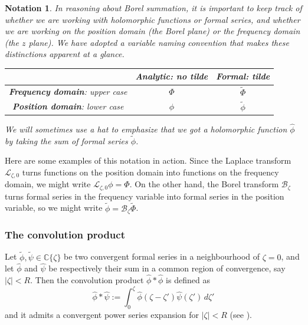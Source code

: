 \documentclass{article}
\newcommand{\C}{\mathbb{C}}
\newcommand{\series}[1]{\tilde{#1}}
\newcommand{\laplace}{\mathcal{L}}
\newcommand{\borel}{\mathcal{B}}
\theoremstyle{definition}
\theoremstyle{plain}
\newtheorem*{notation*}{Notation}
\begin{document}
\begin{notation*}
In reasoning about Borel summation, it is important to keep track of whether we are working with holomorphic functions or formal series, and whether we are working on the position domain (the Borel plane) or the frequency domain (the $z$ plane). We have adopted a variable naming convention that makes these distinctions apparent at a glance.
\color{LimeGreen}
\begin{center}
\begin{tabular}{c|c|c}
& \textbf{Analytic}: no tilde & \textbf{Formal}: tilde \\[1mm] \hline
\vphantom{\rule{0mm}{5mm}} \textbf{Frequency domain}: upper case & $\Phi$ & $\series{\Phi}$ \\[1mm] \hline
\vphantom{\rule{0mm}{5mm}} \textbf{Position domain}: lower case & $\phi$ & $\series{\phi}$ \\[1mm]
\end{tabular}
\end{center}
We will sometimes use a hat to emphasize that we got a holomorphic function $\hat{\phi}$ by taking the sum of formal series $\series{\phi}$.
\end{notation*}
Here are some examples of this notation in action. Since the Laplace transform $\laplace_{\zeta, 0}$ turns functions on the position domain into functions on the frequency domain, we might write $\laplace_{\zeta,0} \phi = \Phi$. On the other hand, the Borel transform $\borel_\zeta$ turns formal series in the frequency variable into formal series in the position variable, so we might write $\series{\phi} = \borel_\zeta \series{\Phi}$.
\color{black}
%
\subsubsection{The convolution product}\label{convolution}
%
Let $\series{\phi},\series{\psi}\in\C\lbrace\zeta\rbrace$ be two convergent formal series in a neighbourhood of $\zeta=0$, and let $\hat{\phi}$ and $\hat{\psi}$ be respectively their sum in a common region of convergence, say $|\zeta|<R$. Then the convolution product $\hat{\phi}\ast\hat{\phi}$ is defined as
\begin{equation}\label{eq:convolution}
    \hat{\phi}\ast\hat{\psi}:=\int_0^{\zeta}\hat{\phi}(\zeta-\zeta')\hat{\psi}(\zeta')\, d\zeta'
\end{equation}
and it admits a convergent power series expansion for $|\zeta|<R$ (see \cite[Lemma 5.14]{diverg-resurg-i}).
\end{document}
